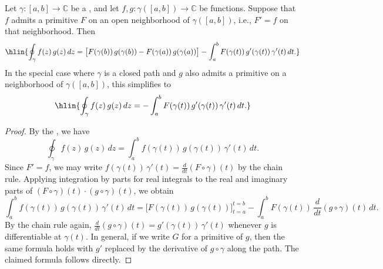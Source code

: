 \begin{proposition} \label{proposition:integration_by_parts_for_contour_integrals_of_complex_valued_functions_along_a_piecewise_continuously_differentiable_path_is_invariant_under_reparametrization}
Let $\gamma : [a,b] \to \mathbb{C}$ be a , and let $f, g : \gamma([a,b]) \to \mathbb{C}$ be  functions. Suppose that $f$ admits a primitive $F$ on an open neighborhood of $\gamma([a,b])$, i.e., $F' = f$ on that neighborhood. Then
$$\hlin{\oint_{\gamma} f(z)\,g(z)\,dz = \bigl[F(\gamma(b))\,g(\gamma(b)) - F(\gamma(a))\,g(\gamma(a))\bigr] - \int_a^b F(\gamma(t))\,g'(\gamma(t))\,\gamma'(t)\,dt.}$$
In the special case where $\gamma$ is a closed path and $g$ also admits a primitive on a neighborhood of $\gamma([a,b])$, this simplifies to
$$\hlin{\oint_{\gamma} f(z)\,g(z)\,dz = - \int_a^b F(\gamma(t))\,g'(\gamma(t))\,\gamma'(t)\,dt.}$$
\end{proposition}

\begin{proof}
    By the , we have
    $$\oint_{\gamma} f(z)\,g(z)\,dz = \int_a^b f(\gamma(t))\,g(\gamma(t))\,\gamma'(t)\,dt.$$
    Since $F' = f$, we may write $f(\gamma(t))\,\gamma'(t) = \frac{d}{dt}(F \circ \gamma)(t)$ by the chain rule. Applying integration by parts for real integrals to the real and imaginary parts of $(F \circ \gamma)(t) \cdot (g \circ \gamma)(t)$, we obtain
    $$\int_a^b f(\gamma(t))\,g(\gamma(t))\,\gamma'(t)\,dt = \bigl[F(\gamma(t))\,g(\gamma(t))\bigr]_{t=a}^{t=b} - \int_a^b F(\gamma(t))\,\frac{d}{dt}(g \circ \gamma)(t)\,dt.$$
    By the chain rule again, $\displaystyle\frac{d}{dt}(g \circ \gamma)(t) = g'(\gamma(t))\,\gamma'(t)$ whenever $g$ is differentiable at $\gamma(t)$. In general, if we write $G$ for a primitive of $g$, then the same formula holds with $g'$ replaced by the derivative of $g \circ \gamma$ along the path. The claimed formula follows directly.
\end{proof}
